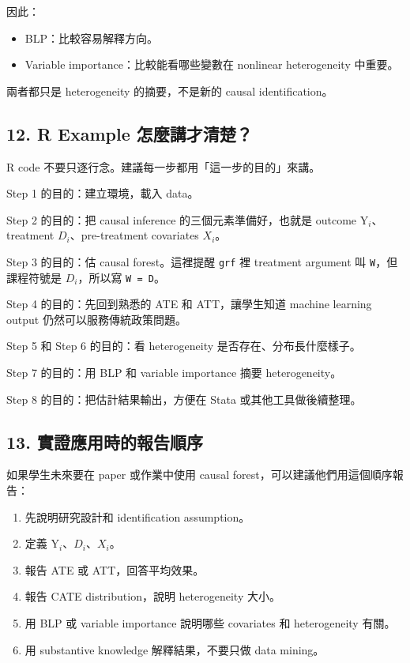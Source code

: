 \documentclass[
  chinese,
  11pt,
]{article}
\providecommand{\tightlist}{%
  \setlength{\itemsep}{0pt}\setlength{\parskip}{0pt}}
\begin{document}
因此：

\begin{itemize}
\tightlist
\item
  BLP：比較容易解釋方向。
\item
  Variable importance：比較能看哪些變數在 nonlinear heterogeneity
  中重要。
\end{itemize}

兩者都只是 heterogeneity 的摘要，不是新的 causal identification。

\subsection{12. R Example
怎麼講才清楚？}\label{r-example-ux600eux9ebcux8b1bux624dux6e05ux695a}

R code 不要只逐行念。建議每一步都用「這一步的目的」來講。

Step 1 的目的：建立環境，載入 data。

Step 2 的目的：把 causal inference 的三個元素準備好，也就是 outcome
\(\mathrm{Y}_i\)、treatment \(D_i\)、pre-treatment covariates \(X_i\)。

Step 3 的目的：估 causal forest。這裡提醒 \texttt{grf} 裡 treatment
argument 叫 \texttt{W}，但課程符號是 \(D_i\)，所以寫 \texttt{W\ =\ D}。

Step 4 的目的：先回到熟悉的 ATE 和 ATT，讓學生知道 machine learning
output 仍然可以服務傳統政策問題。

Step 5 和 Step 6 的目的：看 heterogeneity 是否存在、分布長什麼樣子。

Step 7 的目的：用 BLP 和 variable importance 摘要 heterogeneity。

Step 8 的目的：把估計結果輸出，方便在 Stata 或其他工具做後續整理。

\subsection{13.
實證應用時的報告順序}\label{ux5be6ux8b49ux61c9ux7528ux6642ux7684ux5831ux544aux9806ux5e8f}

如果學生未來要在 paper 或作業中使用 causal
forest，可以建議他們用這個順序報告：

\begin{enumerate}
\def\labelenumi{\arabic{enumi}.}
\tightlist
\item
  先說明研究設計和 identification assumption。
\item
  定義 \(\mathrm{Y}_i\)、\(D_i\)、\(X_i\)。
\item
  報告 ATE 或 ATT，回答平均效果。
\item
  報告 CATE distribution，說明 heterogeneity 大小。
\item
  用 BLP 或 variable importance 說明哪些 covariates 和 heterogeneity
  有關。
\item
  用 substantive knowledge 解釋結果，不要只做 data mining。
\end{enumerate}
\end{document}
